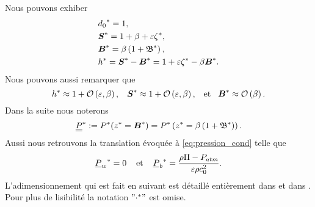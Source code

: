 \noindent Nous pouvons exhiber 
\begin{subequations}
\begin{align}
	&{{d_0}^{*}} = 1,\\
	&{{\boldsymbol{S}}^{*}} = 1+ \beta + \varepsilon{{\zeta}^{*}} ,\\
	&{{\boldsymbol{B}}^{*}} = \beta \left( 1+ {{\mathfrak{B}}^{*}}\right),\\
	&{{h}^{*}} = {{\boldsymbol{S}}^{*}} - {{\boldsymbol{B}}^{*}} = 1 + \varepsilon{{\zeta}^{*}} - \beta{{\boldsymbol{B}}^{*}}. \label{eq:htilde}
\end{align}
\end{subequations}
Nous pouvons aussi remarquer que
\begin{equation*}
	{{h}^{*}} \approx 1+\mathcal{O}\left(\varepsilon,\beta\right), \hspace{3mm} {{\boldsymbol{S}}^{*}} \approx 1+\mathcal{O}\left(\varepsilon, \beta\right),\hspace{3mm}\text{et}\hspace{3mm} {{\boldsymbol{B}}^{*}}\approx\mathcal{O}\left(\beta\right).
\end{equation*}
Dans la suite nous noterons
\begin{equation}
	{{\underline{\underline{P}}}^{*}} := {{P}^{*}}({{z}^{*}} = {{\boldsymbol{B}}^{*}}) = {{P}^{*}}\left({{z}^{*}} = \beta\left(1+{{\mathfrak{B}}^{*}}\right)\right).
\end{equation}
Aussi nous retrouvons la translation évoquée à \eqref{eq:pression_cond} telle que
\begin{equation*}
	{{\underline{P}_w}^{*}} =  0\hspace{4mm}\text{et}\hspace{4mm}{{\underline{P}_b}^{*}} = \frac{\rho \Pi - P_{atm}}{\varepsilon\rho c_0^2}.
\end{equation*}
\noindent L'adimensionnement qui est fait en suivant est détaillé entièrement dans \citet{Pons2018} et dans \citet{bosi_spectral_2019}. Pour plus de lisibilité la notation $"{{\cdot}^{*}}"$ est omise.

